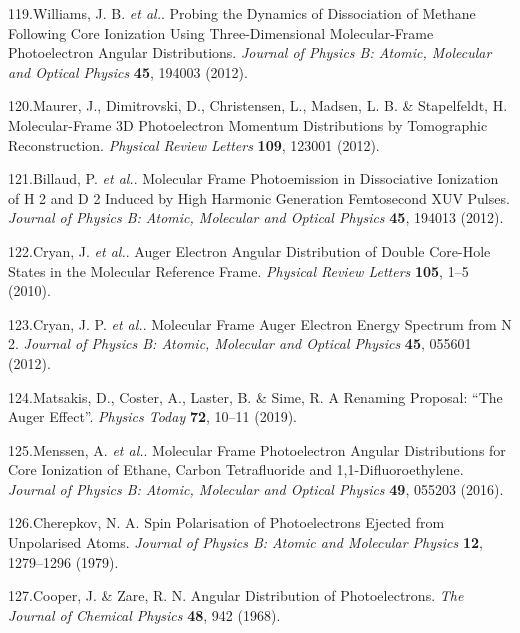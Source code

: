 \documentclass[10pt]{article}
\begin{document}
\label{csl:119}119.Williams, J. B. \textit{et al.}. {Probing the Dynamics of Dissociation of Methane Following Core Ionization Using Three-Dimensional Molecular-Frame Photoelectron Angular Distributions}. \textit{Journal of Physics B: Atomic, Molecular and Optical Physics} \textbf{45}, 194003 (2012).

\label{csl:120}120.Maurer, J., Dimitrovski, D., Christensen, L., Madsen, L. B. \& Stapelfeldt, H. {Molecular-{{Frame 3D Photoelectron Momentum Distributions}} by {{Tomographic Reconstruction}}}. \textit{Physical Review Letters} \textbf{109}, 123001 (2012).

\label{csl:121}121.Billaud, P. \textit{et al.}. {Molecular Frame Photoemission in Dissociative Ionization of {{H}} 2 and {{D}} 2 Induced by High Harmonic Generation Femtosecond {{XUV}} Pulses}. \textit{Journal of Physics B: Atomic, Molecular and Optical Physics} \textbf{45}, 194013 (2012).

\label{csl:122}122.Cryan, J. \textit{et al.}. {Auger {{Electron Angular Distribution}} of {{Double Core-Hole States}} in the {{Molecular Reference Frame}}}. \textit{Physical Review Letters} \textbf{105}, 1–5 (2010).

\label{csl:123}123.Cryan, J. P. \textit{et al.}. {Molecular Frame {{Auger}} Electron Energy Spectrum from {{N}} 2}. \textit{Journal of Physics B: Atomic, Molecular and Optical Physics} \textbf{45}, 055601 (2012).

\label{csl:124}124.Matsakis, D., Coster, A., Laster, B. \& Sime, R. {A Renaming Proposal: ``{{The Auger}} Effect''}. \textit{Physics Today} \textbf{72}, 10–11 (2019).

\label{csl:125}125.Menssen, A. \textit{et al.}. {Molecular Frame Photoelectron Angular Distributions for Core Ionization of Ethane, Carbon Tetrafluoride and 1,1-Difluoroethylene}. \textit{Journal of Physics B: Atomic, Molecular and Optical Physics} \textbf{49}, 055203 (2016).

\label{csl:126}126.Cherepkov, N. A. {Spin Polarisation of Photoelectrons Ejected from Unpolarised Atoms}. \textit{Journal of Physics B: Atomic and Molecular Physics} \textbf{12}, 1279–1296 (1979).

\label{csl:127}127.Cooper, J. \& Zare, R. N. {Angular {{Distribution}} of {{Photoelectrons}}}. \textit{The Journal of Chemical Physics} \textbf{48}, 942 (1968).
\end{document}
